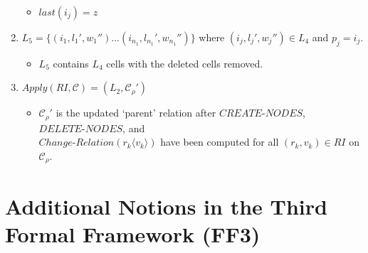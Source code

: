 \documentclass{article}
\newcommand{\mn}{\text{-}}
\begin{document}
\begin{appendices}
\begin{enumerate}
\begin{itemize}
         \item $last(i_j) = z$
         \end{itemize}
   \item $L_5 = \{(i_1,l_1',w_1'')...(i_{n_1},l_{n_1}',w_{n_1}'')\}$ where $(i_j,l_j',w_j'') \in L_4$ and $p_j = i_j$. 
         \begin{itemize}
         \item $L_5$ contains $L_4$ cells with the deleted cells removed.
         \end{itemize}
   \item $Apply(RI,\mathcal{C}) = (L_2, \mathcal{C}_{\rho}')$
         \begin{itemize}
         \item $\mathcal{C}_{\rho}'$ is the updated `parent' relation after $CREATE\mn NODES$, $DELETE\mn NODES$, and\\ $Change\mn Relation(r_k\langle v_k\rangle)$ have been computed
               for all $(r_k,v_k) \in RI$ on $\mathcal{C}_{\rho}$.
         \end{itemize}
\end{enumerate}


\section{Additional Notions in the Third Formal Framework (FF3)} \label{a-ff3}



\end{appendices}
\end{document}
